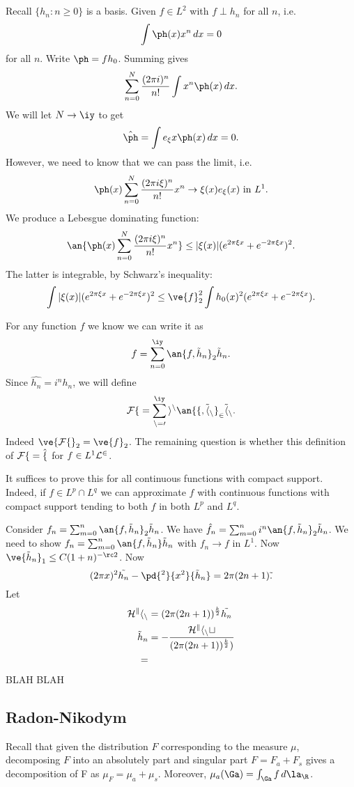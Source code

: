 
\subsection{}
Recall $\{h_n:n\ge 0\}$ is a basis. Given $f\in L^2$ with $f\perp h_n$ for all $n$, i.e. 
\[
\int \ph(x) x^n\,dx=0
\]
for all $n$. 
Write $\ph=fh_0$. Summing gives
\[
\sum_{n=0}^N  \frac{(2\pi i)^n}{n!} \int x^n \ph(x)\,dx.
\]
We will let $N\to \iy$ to get
\[
\hat{\ph}=\int e_{\xi} x\ph(x)\,dx=0.
\]
However, we need to know that we can pass the limit, i.e. \[\ph(x)\sum_{n=0}^N \frac{(2\pi i\xi)^n}{n!} x^n\rightarrow \xi(x)e_{\xi}(x)\text{ in }L^1.\]
We produce a Lebesgue dominating function:
\[
\an{\ph(x)\sum_{n=0}^N \frac{(2\pi i\xi)^n}{n!} x^n}\le |\xi(x)|(e^{2\pi \xi x}+e^{-2\pi \xi x})^2.
\]
The latter is integrable, by Schwarz's inequality:
\[
\int |\xi(x)|(e^{2\pi \xi x}+e^{-2\pi \xi x})^2\le \ve{f}_2^2\int h_0(x)^2 (e^{2\pi \xi x}+e^{-2\pi \xi x}).
\]

For any function $f$ we know we can write it as
\[
f=\sum_{n=0}^{\iy} \an{f,\tilde h_n}_2 \tilde h_n.
\]
Since $\hat{h_n}=i^n h_n$, we will define
\[
\cal Ff=\sum_{n=0}^{\iy}i^n \an{f,\tilde h_n}_2\tilde h_n.
\]
Indeed $\ve{\cal Ff}_2=\ve{f}_2$. The remaining question is whether this definition of $\cal Ff=\hat f$ for $f\in L^1\cal L^2$.

It suffices to prove this for all continuous functions with compact support. Indeed, if $f\in L^p\cap L^q$ we can approximate $f$ with continuous functions with compact support tending to both $f$ in both $L^p$ and $L^q$.

Consider $f_n=\sum_{m=0}^n \an{f,\tilde h_n}_2\tilde h_n$. We have $\hat f_n=\sum_{m=0}^n i^n \an{f,\tilde h_n}_2 \tilde h_n$. We need to show $f_n=\sum_{m=0}^n \an{f,\tilde h_n}\tilde h_n$ with $f_n\to f$ in $L^1$. Now $\ve{\tilde h_n}_1\le C(1+n)^{-\rc  2}$. %
Now
\[
(2\pi x)^2 \tilde{h_n}-\pd{^2}{x^2}{\tilde h_n}=2\pi (2n+1)\tilde.
\]
Let
\begin{align*}
\cal H^k h_n&=(2\pi(2n+1))^{\frac k2} \tilde{h_n}\\%
\tilde h_n&=-\frac{\cal H^kh_nt}{(2\pi(2n+1))^{\frac k2})}\\
=&%
\end{align*}
BLAH BLAH
\subsection{Radon-Nikodym}
Recall that given the distribution $F$ corresponding to the measure $\mu$, decomposing $F$ into an absolutely part and singular part $F=F_a+F_s$ gives a decomposition of F as $\mu_F=\mu_a+\mu_s$. Moreover, $\mu_a(\Ga)=\int_{\Ga} f\,d\la_{\R}$.

